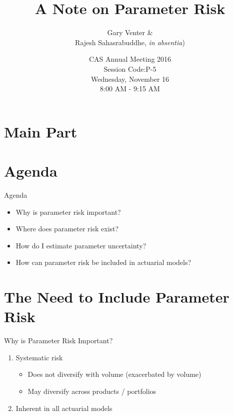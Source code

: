 \documentclass[10pt, xcolor=x11names,compress]{beamer}
\title{A Note on Parameter Risk}
\subtitle{Gary Venter \& \\
	Rajesh Sahasrabuddhe, \textit{in absentia})}
\date{
	CAS Annual Meeting 2016\\
	Session Code:P-5\\
	Wednesday, November 16\\
	8:00 AM - 9:15 AM	
	}
\begin{document}
\section{Main Part}
\begin{frame}
\maketitle
\end{frame}

\section{Agenda}
\begin{frame}{Agenda}
\begin{itemize}
	\item<1-> Why is parameter risk important?
	\item<2-> Where does parameter risk exist?
	\item<3-> How do I estimate parameter uncertainty?
	\item<4-> How can parameter risk be included in actuarial models?		
\end{itemize}
\end{frame}

\section{The Need to Include Parameter Risk}
\begin{frame}{Why is Parameter Risk Important?}
	\begin{enumerate}
		\item<1-> Systematic risk
		\begin{itemize}
			\item<2-> Does not diversify with volume (exacerbated by volume)
			\item<2-> May diversify across products / portfolios
		\end{itemize}
		\item<3-> Inherent in all actuarial models		
	\end{enumerate}
\end{frame}
\end{document}

